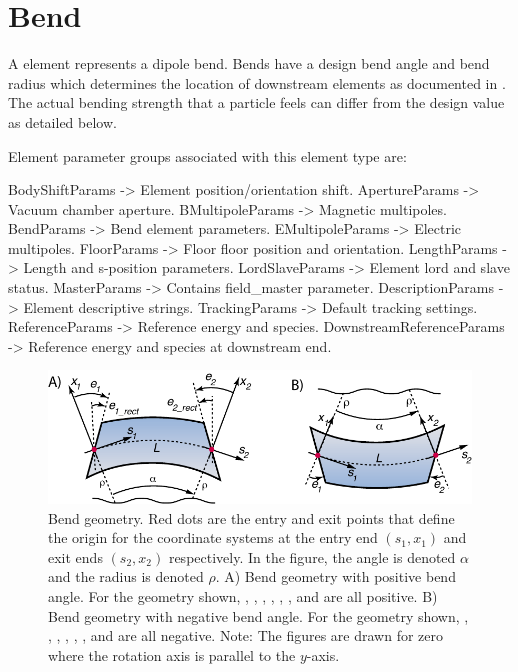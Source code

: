 \newpage

\section{Bend}
\label{s:bend}

A  element represents a dipole bend. Bends have a design bend angle and bend radius
which determines the location of downstream elements as documented in .
The actual bending strength that a particle feels can differ from the design value as detailed
below.

Element parameter groups associated with this element type are:
\TOPrule
\begin{example}
  BodyShiftParams     -> Element position/orientation shift.  
  ApertureParams      -> Vacuum chamber aperture.  
  BMultipoleParams    -> Magnetic multipoles.  
  BendParams          -> Bend element parameters.  
  EMultipoleParams    -> Electric multipoles.  
  FloorParams -> Floor floor position and orientation.  
  LengthParams        -> Length and s-position parameters.  
  LordSlaveParams     -> Element lord and slave status.  
  MasterParams        -> Contains field_master parameter.  
  DescriptionParams   -> Element descriptive strings.  
  TrackingParams      -> Default tracking settings.  
  ReferenceParams     -> Reference energy and species. 
  DownstreamReferenceParams -> Reference energy and species at downstream end. 
\end{example}
\BOTTOMrule


\begin{figure}[ht]
  \centering 
  \includegraphics{bend.pdf} 
\caption[Bend geometry]{
Bend geometry. Red dots are the entry and exit points that define the origin for the
coordinate systems at the entry end $(s_1, x_1)$ and exit ends $(s_2, x_2)$ respectively. 
In the figure, the angle  is denoted $\alpha$ and the radius
 is denoted $\rho$.
A) Bend geometry with positive bend angle. For the geometry shown, 
, , , , , , and  are all positive.
B) Bend geometry with negative bend angle. For the geometry shown, 
, , , , , , and  are all negative.
Note: The figures are drawn for zero  where the rotation axis is parallel to the 
$y$-axis. 
}
\label{f:bend2}
\end{figure}

